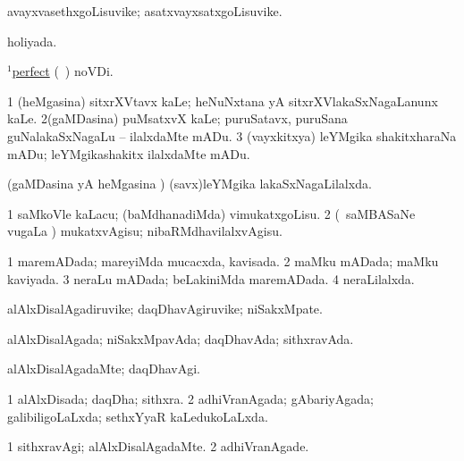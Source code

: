 \bentry
{} 
\gl{\nA}
\expl{}
\bmng
avayxvasethxgoLisuvike; asatxvayxsatxgoLisuvike. 
\emng
\eentry

\bentry
{} 
\gl{\gu}
\expl{}
\bmng
holiyada. 
\emng
\eentry

\bentry
{}
\gl{\nA}
\expl{}
\bmng
\hyperref{kandict_p.pdf}{P}{perfect(1)}{$^1$perfect} (\pagu\ ) noVDi. 
\emng
\eentry

\bentry
{} 
\gl{\sakirx}
\expl{}
\bmng
\bnum
\num{1} (heMgasina) sitxrXVtavx kaLe; heNuNxtana yA sitxrXVlakaSxNagaLanunx kaLe. 
\num{2}(gaMDasina) puMsatxvX kaLe; puruSatavx, puruSana guNalakaSxNagaLu -- ilalxdaMte mADu. 
\num{3} (vayxkitxya) leYMgika shakitxharaNa mADu; leYMgikashakitx ilalxdaMte mADu. 
\enum
\emng
\eentry

\bentry
{} 
\gl{\gu}
\expl{}
\bmng
(gaMDasina yA heMgasina \vi) (savx)leYMgika lakaSxNagaLilalxda. 
\emng
\eentry

\bentry
{} 
\gl{\sakirx}
\expl{}
\bmng
\bnum
\num{1} saMkoVle kaLacu; (baMdhanadiMda) vimukatxgoLisu. 
\num{2} (\kanmu\ saMBASaNe \mo vugaLa \vi) mukatxvAgisu; nibaRMdhavilalxvAgisu. 
\enum
\emng
\eentry

\bentry
{} 
\gl{\gu}
\expl{}
\bmng
\bnum
\num{1} maremADada; mareyiMda mucacxda, kavisada. 
\num{2} maMku mADada; maMku kaviyada. 
\num{3} neraLu mADada; beLakiniMda maremADada. 
\num{4} neraLilalxda. 
\enum
\emng
\eentry

\bentry
{} 
\gl{\nA}
\expl{}
\bmng
alAlxDisalAgadiruvike; daqDhavAgiruvike; niSakxMpate. 
\emng
\eentry

\bentry
{} 
\gl{\gu}
\expl{}
\bmng
alAlxDisalAgada; niSakxMpavAda; daqDhavAda; sithxravAda. 
\emng
\eentry

\bentry
{} 
\gl{\kirxvi}
\expl{}
\bmng
alAlxDisalAgadaMte; daqDhavAgi. 
\emng
\eentry

\bentry
{} 
\gl{\gu}
\expl{}
\bmng
\bnum
\num{1} alAlxDisada; daqDha; sithxra. 
\num{2} adhiVranAgada; gAbariyAgada; galibiligoLaLxda; sethxYyaR kaLedukoLaLxda. 
\enum
\emng
\eentry

\bentry
{} 
\gl{\kirxvi}
\expl{}
\bmng
\bnum
\num{1} sithxravAgi; alAlxDisalAgadaMte. 
\num{2} adhiVranAgade. 
\enum
\emng
\eentry

